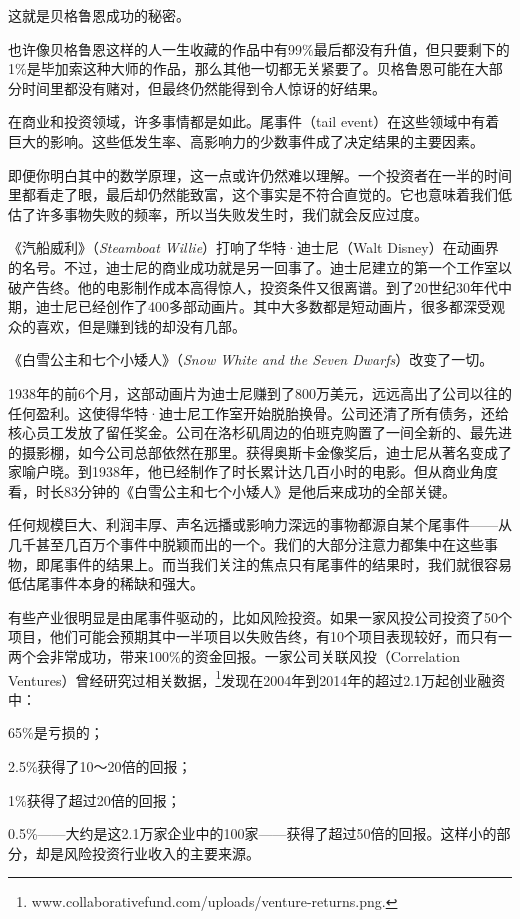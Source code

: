 这就是贝格鲁恩成功的秘密。

也许像贝格鲁恩这样的人一生收藏的作品中有99\%最后都没有升值，但只要剩下的1\%是毕加索这种大师的作品，那么其他一切都无关紧要了。贝格鲁恩可能在大部分时间里都没有赌对，但最终仍然能得到令人惊讶的好结果。

在商业和投资领域，许多事情都是如此。尾事件（tail event）在这些领域中有着巨大的影响。这些低发生率、高影响力的少数事件成了决定结果的主要因素。

即便你明白其中的数学原理，这一点或许仍然难以理解。一个投资者在一半的时间里都看走了眼，最后却仍然能致富，这个事实是不符合直觉的。它也意味着我们低估了许多事物失败的频率，所以当失败发生时，我们就会反应过度。

《汽船威利》（\textit{Steamboat Willie}）打响了华特·迪士尼（Walt Disney）在动画界的名号。不过，迪士尼的商业成功就是另一回事了。迪士尼建立的第一个工作室以破产告终。他的电影制作成本高得惊人，投资条件又很离谱。到了20世纪30年代中期，迪士尼已经创作了400多部动画片。其中大多数都是短动画片，很多都深受观众的喜欢，但是赚到钱的却没有几部。

《白雪公主和七个小矮人》（\textit{Snow White and the Seven Dwarfs}）改变了一切。

1938年的前6个月，这部动画片为迪士尼赚到了800万美元，远远高出了公司以往的任何盈利。这使得华特·迪士尼工作室开始脱胎换骨。公司还清了所有债务，还给核心员工发放了留任奖金。公司在洛杉矶周边的伯班克购置了一间全新的、最先进的摄影棚，如今公司总部依然在那里。获得奥斯卡金像奖后，迪士尼从著名变成了家喻户晓。到1938年，他已经制作了时长累计达几百小时的电影。但从商业角度看，时长83分钟的《白雪公主和七个小矮人》是他后来成功的全部关键。

任何规模巨大、利润丰厚、声名远播或影响力深远的事物都源自某个尾事件——从几千甚至几百万个事件中脱颖而出的一个。我们的大部分注意力都集中在这些事物，即尾事件的结果上。而当我们关注的焦点只有尾事件的结果时，我们就很容易低估尾事件本身的稀缺和强大。

有些产业很明显是由尾事件驱动的，比如风险投资。如果一家风投公司投资了50个项目，他们可能会预期其中一半项目以失败告终，有10个项目表现较好，而只有一两个会非常成功，带来100\%的资金回报。一家公司关联风投（Correlation Ventures）曾经研究过相关数据，\footnote{www.collaborativefund.com/uploads/venture-returns.png.}发现在2004年到2014年的超过2.1万起创业融资中：

65\%是亏损的；

2.5\%获得了10～20倍的回报；

1\%获得了超过20倍的回报；

0.5\%——大约是这2.1万家企业中的100家——获得了超过50倍的回报。这样小的部分，却是风险投资行业收入的主要来源。

